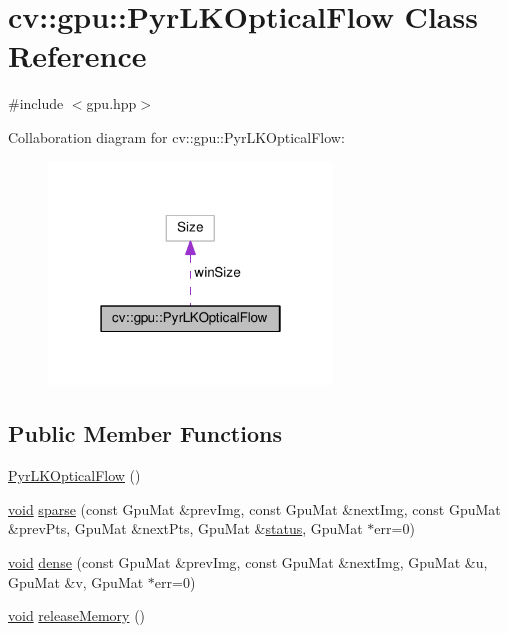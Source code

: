 \hypertarget{classcv_1_1gpu_1_1PyrLKOpticalFlow}{\section{cv\-:\-:gpu\-:\-:Pyr\-L\-K\-Optical\-Flow Class Reference}
\label{classcv_1_1gpu_1_1PyrLKOpticalFlow}
}


{\ttfamily \#include $<$gpu.\-hpp$>$}



Collaboration diagram for cv\-:\-:gpu\-:\-:Pyr\-L\-K\-Optical\-Flow\-:\nopagebreak
\begin{figure}[H]
\begin{center}
\leavevmode
\includegraphics[width=214pt]{classcv_1_1gpu_1_1PyrLKOpticalFlow__coll__graph}
\end{center}
\end{figure}
\subsection*{Public Member Functions}
\begin{DoxyCompactItemize}
\item 
\hyperlink{classcv_1_1gpu_1_1PyrLKOpticalFlow_afe312e0710a2c1da0cdc8f1bd0242811}{Pyr\-L\-K\-Optical\-Flow} ()
\item 
\hyperlink{legacy_8hpp_a8bb47f092d473522721002c86c13b94e}{void} \hyperlink{classcv_1_1gpu_1_1PyrLKOpticalFlow_aa4281071384c58e1a642064e14e9437c}{sparse} (const Gpu\-Mat \&prev\-Img, const Gpu\-Mat \&next\-Img, const Gpu\-Mat \&prev\-Pts, Gpu\-Mat \&next\-Pts, Gpu\-Mat \&\hyperlink{tracking_8hpp_ae17b3c2584dab511e91d1c96644018bf}{status}, Gpu\-Mat $\ast$err=0)
\item 
\hyperlink{legacy_8hpp_a8bb47f092d473522721002c86c13b94e}{void} \hyperlink{classcv_1_1gpu_1_1PyrLKOpticalFlow_a17cea0e7ae9c6a85730448179bc3d816}{dense} (const Gpu\-Mat \&prev\-Img, const Gpu\-Mat \&next\-Img, Gpu\-Mat \&u, Gpu\-Mat \&v, Gpu\-Mat $\ast$err=0)
\item 
\hyperlink{legacy_8hpp_a8bb47f092d473522721002c86c13b94e}{void} \hyperlink{classcv_1_1gpu_1_1PyrLKOpticalFlow_a43e7b0856d228e95fc981caed310a266}{release\-Memory} ()
\end{DoxyCompactItemize}

